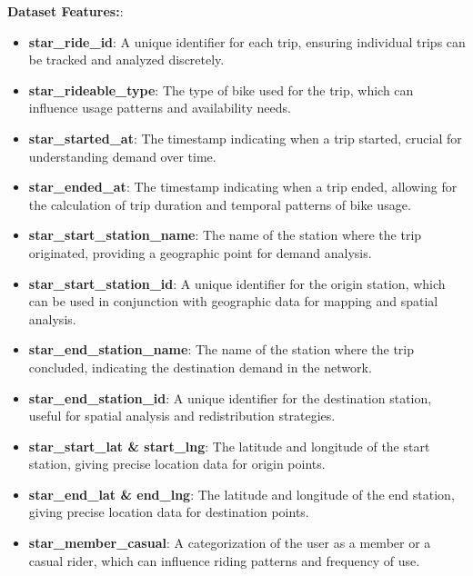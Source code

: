 \documentclass[12pt, a4paper]{article}
\begin{document}
        \textbf{Dataset Features:}:
    \begin{itemize}
        \item \textbf{star\_ride\_id}: A unique identifier for each trip, ensuring individual trips can be tracked and analyzed discretely.
        \item \textbf{star\_rideable\_type}: The type of bike used for the trip, which can influence usage patterns and availability needs.
        \item \textbf{star\_started\_at}: The timestamp indicating when a trip started, crucial for understanding demand over time.
        \item \textbf{star\_ended\_at}: The timestamp indicating when a trip ended, allowing for the calculation of trip duration and temporal patterns of bike usage.
        \item \textbf{star\_start\_station\_name}: The name of the station where the trip originated, providing a geographic point for demand analysis.
        \item \textbf{star\_start\_station\_id}: A unique identifier for the origin station, which can be used in conjunction with geographic data for mapping and spatial analysis.
        \item \textbf{star\_end\_station\_name}: The name of the station where the trip concluded, indicating the destination demand in the network.
        \item \textbf{star\_end\_station\_id}: A unique identifier for the destination station, useful for spatial analysis and redistribution strategies.
        \item \textbf{star\_start\_lat \& start\_lng}: The latitude and longitude of the start station, giving precise location data for origin points.
        \item \textbf{star\_end\_lat \& end\_lng}: The latitude and longitude of the end station, giving precise location data for destination points.
        \item \textbf{star\_member\_casual}: A categorization of the user as a member or a casual rider, which can influence riding patterns and frequency of use.
    \end{itemize}
\end{document}
